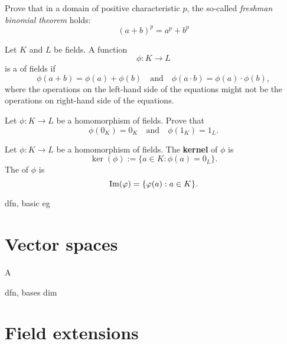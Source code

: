 \documentclass{ximera}
\begin{document}
\begin{exercise}\label{E:FBT}
Prove that in a domain of positive characteristic $p$, the so-called
\textit{freshman binomial theorem} holds:
\[
(a+b)^p = a^p + b^p
\]
\end{exercise}





\begin{definition}
  Let $K$ and $L$ be fields. A function
  \[
  \phi:K\to L
  \]
  is a  of fields if
  \[
  \phi(a+b) = \phi(a)+\phi(b)\quad\text{and}\quad\phi(a\cdot b) = \phi(a)\cdot \phi(b),
  \]
  where the operations on the left-hand side of the equations might not
  be the operations on right-hand side of the equations. 
\end{definition}

\begin{exercise}
  Let $\phi:K\to L$ be a homomorphism of fields. Prove that
  \[
  \phi(0_K) = 0_K\quad\text{and}\quad\phi(1_K) = 1_L.
  \]
\end{exercise}


\begin{definition}
  Let $\phi: K\to L$ be a homomorphism of fields. The \textbf{kernel}
  of $\phi$ is
  \[
  \ker(\phi) := \{a\in K:\phi(a) = 0_L\}.
  \]
  The  of $\phi$ is
  \[
  \operatorname{Im}(\varphi) = \{\varphi(a):a\in K\}.
  \]
\end{definition}


\begin{example}
\end{example}


dfn, basic eg


\section{Vector spaces}



\begin{definition}
  A 
\end{definition}

dfn, bases dim

\section{Field extensions}
\end{document}

